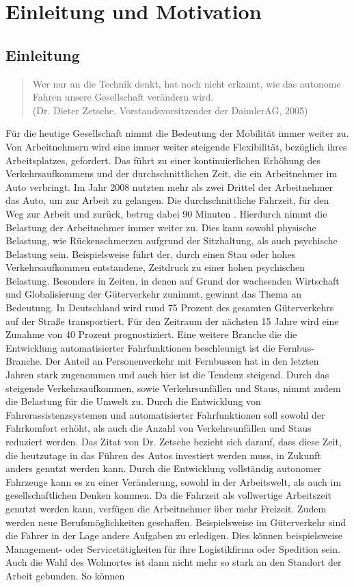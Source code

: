 \chapter{Einleitung und Motivation}
\section{Einleitung}
\begin{quote} Wer nur an die Technik denkt, hat noch nicht erkannt, wie das autonome Fahren unsere Gesellschaft ver\"andern wird. \\(Dr. Dieter Zetsche, Vorstandsvorsitzender der DaimlerAG, 2005)
 \end{quote}
F\"ur die heutige Gesellschaft nimmt die Bedeutung der Mobilit\"at immer weiter zu. Von Arbeitnehmern wird eine immer weiter steigende Flexibilit\"at, bez\"uglich ihres Arbeitsplatzes, gefordert. Das f\"uhrt zu einer kontinuierlichen Erh\"ohung des Verkehrsaufkommens und der durchschnittlichen Zeit, die ein Arbeitnehmer im Auto verbringt. Im Jahr 2008 nutzten mehr als zwei Drittel der Arbeitnehmer das Auto, um zur Arbeit zu gelangen. Die durchschnittliche Fahrzeit, f\"ur den Weg zur Arbeit und zur\"uck, betrug dabei 90 Minuten \cite{Radstand2008}. Hierdurch nimmt die Belastung der Arbeitnehmer immer weiter zu. Dies kann sowohl physische Belastung, wie R\"uckenschmerzen aufgrund der Sitzhaltung, als auch psychische Belastung sein. Beispielsweise f\"uhrt der, durch einen Stau oder hohes Verkehrsaufkommen entstandene, Zeitdruck zu einer hohen psychischen Belastung. Besonders in Zeiten, in denen auf Grund der wachsenden Wirtschaft und Globalisierung der G\"uterverkehr zunimmt\cite{Huetter2013}, gewinnt das Thema an Bedeutung. In Deutschland wird rund 75 Prozent des gesamten G\"uterverkehrs auf der Stra{\ss}e transportiert. F\"ur den Zeitraum der n\"achsten 15 Jahre wird eine Zunahme von 40 Prozent prognostiziert\cite{NTV2016}. Eine weitere Branche die die Entwicklung automatisierter Fahrfunktionen beschleunigt ist die Fernbus-Branche. Der Anteil an Personenverkehr mit Fernbussen hat in den letzten Jahren stark zugenommen und auch hier ist die Tendenz steigend\cite{ODB2014}. Durch das steigende Verkehrsaufkommen, sowie Verkehrsunf\"allen und Staus, nimmt zudem die Belastung f\"ur die Umwelt zu. Durch die Entwicklung von Fahrerassistenzsystemen und automatisierter Fahrfunktionen soll sowohl der Fahrkomfort erh\"oht, als auch die Anzahl von Verkehrsunf\"allen und Staus reduziert werden. Das Zitat von Dr. Zetsche bezieht sich darauf, dass diese Zeit, die heutzutage in das F\"uhren des Autos investiert werden muss, in Zukunft anders genutzt werden kann. Durch die Entwicklung vollst\"andig autonomer Fahrzeuge kann es zu einer Ver\"anderung, sowohl in der Arbeitswelt, als auch im gesellschaftlichen Denken kommen. Da die Fahrzeit als vollwertige Arbeitszeit genutzt werden kann, verf\"ugen die Arbeitnehmer \"uber mehr Freizeit. Zudem werden neue Berufsm\"oglichkeiten geschaffen. Beispielsweise im G\"uterverkehr sind die Fahrer in der Lage andere Aufgaben zu erledigen. Dies k\"onnen beispielsweise Management- oder Servicet\"atigkeiten f\"ur ihre Logistikfirma oder Spedition sein. Auch die Wahl des Wohnortes ist dann nicht mehr so stark an den Standort der Arbeit gebunden. So k\"onnen 